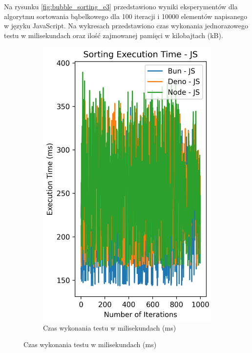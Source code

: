 Na rysunku \ref{fig:bubble_sorting_e3} przedstawiono wyniki eksperymentów dla algorytmu sortowania bąbelkowego dla 100 iteracji i 10000 elementów napisanego w języku JavaScript. Na wykresach przedstawiono czas wykonania jednorazowego testu w milisekundach oraz ilość zajmowanej pamięci w kilobajtach (kB).

\begin{figure}[H]
  \centering
  \begin{subfigure}[b]{0.42\textwidth}
    \centering
    \includegraphics[width=\textwidth]{Figures/sorting/sorting_bubble_1000_10000_js_time.png}
    \caption{Czas wykonania testu w milisekundach (ms)}
    \label{fig:bubble_sorting_e3_time}

\end{subfigure}
\end{figure}
